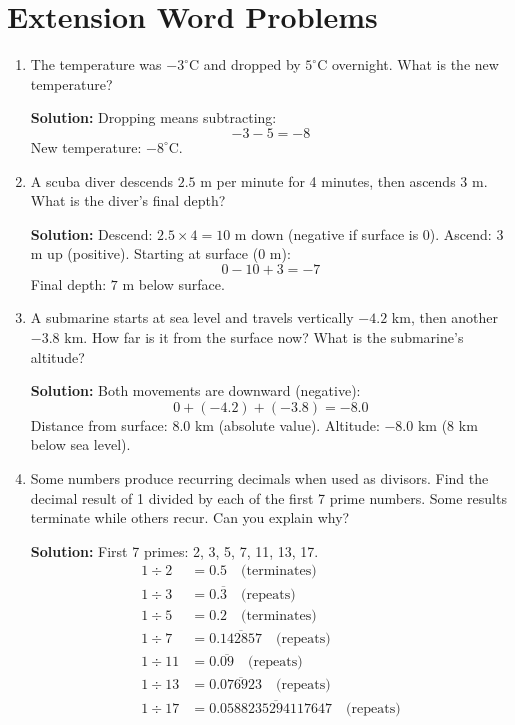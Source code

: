 \documentclass[12pt,a4paper]{article}
\begin{document}
\section*{Extension Word Problems}

\begin{enumerate}
    \item The temperature was $-3^\circ$C and dropped by $5^\circ$C overnight. What is the new temperature?
    
    \textbf{Solution:} Dropping means subtracting:
    \[-3 - 5 = -8\]
    New temperature: $-8^\circ$C.
    
    \item A scuba diver descends $2.5$ m per minute for 4 minutes, then ascends $3$ m. What is the diver's final depth?
    
    \textbf{Solution:} Descend: $2.5 \times 4 = 10$ m down (negative if surface is 0).
    Ascend: $3$ m up (positive).
    Starting at surface (0 m):
    \[0 - 10 + 3 = -7\]
    Final depth: $7$ m below surface.
    
    \item A submarine starts at sea level and travels vertically $-4.2$ km, then another $-3.8$ km. How far is it from the surface now? What is the submarine's altitude?
    
    \textbf{Solution:} Both movements are downward (negative):
    \[0 + (-4.2) + (-3.8) = -8.0\]
    Distance from surface: $8.0$ km (absolute value).
    Altitude: $-8.0$ km (8 km below sea level).
    
    \item Some numbers produce recurring decimals when used as divisors. Find the decimal result of 1 divided by each of the first 7 prime numbers. Some results terminate while others recur. Can you explain why?
    
    \textbf{Solution:} First 7 primes: 2, 3, 5, 7, 11, 13, 17.
    \begin{align*}
        1 \div 2 &= 0.5 \quad \text{(terminates)} \\
        1 \div 3 &= 0.\overline{3} \quad \text{(repeats)} \\
        1 \div 5 &= 0.2 \quad \text{(terminates)} \\
        1 \div 7 &= 0.\overline{142857} \quad \text{(repeats)} \\
        1 \div 11 &= 0.\overline{09} \quad \text{(repeats)} \\
        1 \div 13 &= 0.\overline{076923} \quad \text{(repeats)} \\
        1 \div 17 &= 0.\overline{0588235294117647} \quad \text{(repeats)}
    \end{align*}
\end{enumerate}
\end{document}
